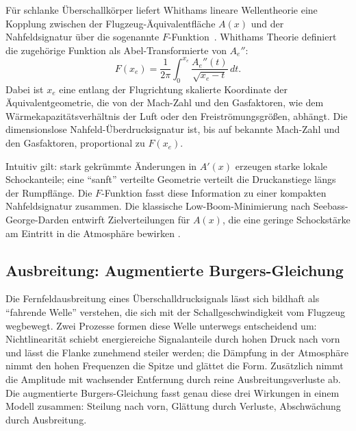 Für schlanke Überschallkörper liefert Whithams lineare Wellentheorie eine
Kopplung zwischen der Flugzeug-Äquivalentfläche $A(x)$ und der
Nahfeldsignatur über die sogenannte $F$-Funktion~\cite{schall:whitham}.
Whithams Theorie definiert die zugehörige Funktion
als Abel-Transformierte von $A_e''$:
\begin{equation*}
    F(x_e)=\frac{1}{2\pi}\int_{0}^{x_e}\frac{A_e''(t)}{\!\sqrt{x_e-t}}\,dt.
\end{equation*}
Dabei ist $x_e$ eine entlang der Flugrichtung skalierte Koordinate der
Äquivalentgeometrie, die von der Mach-Zahl und den Gasfaktoren,
wie dem Wärmekapazitätsverhältnis der Luft oder den Freiströmungsgrößen,
abhängt.
Die dimensionslose Nahfeld-Überdrucksignatur ist, bis auf bekannte
Mach-Zahl und den Gasfaktoren, proportional zu $F(x_e)$.

Intuitiv gilt: stark gekrümmte Änderungen in $A'(x)$ erzeugen starke lokale
Schockanteile; eine ``sanft'' verteilte Geometrie verteilt die Druckanstiege
längs der Rumpflänge.
Die $F$-Funktion fasst diese Information zu einer kompakten Nahfeldsignatur zusammen.
Die klassische Low-Boom-Minimierung nach Seebass-George-Darden entwirft
Zielverteilungen für $A(x)$, die eine geringe Schockstärke am Eintritt in
die Atmosphäre bewirken \cite{schall:darden75, schall:seebassgeorge}.

\subsection{Ausbreitung: Augmentierte Burgers-Gleichung}
Die Fernfeldausbreitung eines Überschalldrucksignals lässt sich bildhaft als
``fahrende Welle'' verstehen, die sich mit der Schallgeschwindigkeit vom
Flugzeug wegbewegt.
Zwei Prozesse formen diese Welle unterwegs entscheidend um:
Nichtlinearität schiebt energiereiche Signalanteile durch hohen
Druck nach vorn und lässt die Flanke zunehmend steiler werden;
die Dämpfung in der Atmosphäre nimmt den hohen Frequenzen die Spitze
%
und glättet die Form.
Zusätzlich nimmt die Amplitude mit wachsender Entfernung durch reine
Ausbreitungsverluste ab.
Die augmentierte Burgers-Gleichung fasst genau diese drei
Wirkungen in einem Modell zusammen: Steilung nach vorn, Glättung durch
Verluste, Abschwächung durch Ausbreitung.

